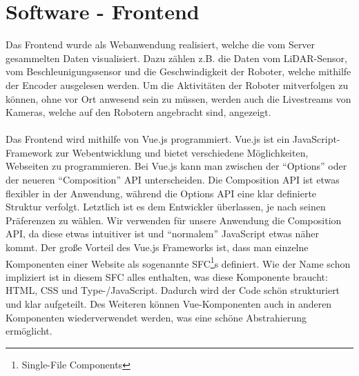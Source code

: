 
\chapter{Software - Frontend}
\label{sec:software_frontend}
Das Frontend wurde als Webanwendung realisiert,
welche die vom Server gesammelten Daten visualisiert.
%
Dazu zählen z.B. die Daten vom LiDAR-Sensor,
vom Beschleunigungssensor
und die Geschwindigkeit der Roboter,
welche mithilfe der Encoder ausgelesen werden.
%
Um die Aktivitäten der Roboter mitverfolgen zu können,
ohne vor Ort anwesend sein zu müssen,
werden auch die Livestreams von Kameras,
welche auf den Robotern angebracht sind,
angezeigt.
\\\\
Das Frontend wird mithilfe von Vue.js programmiert.
%
Vue.js ist ein JavaScript-Framework zur Webentwicklung
und bietet verschiedene Möglichkeiten,
Webseiten zu programmieren.
%
Bei Vue.js kann man zwischen der ``Options'' oder
der neueren ``Composition'' API unterscheiden.
%
Die Composition API ist etwas flexibler in der Anwendung,
während die Options API eine klar definierte Struktur verfolgt.
%
Letztlich ist es dem Entwickler überlassen,
je nach seinen Präferenzen zu wählen.
%
Wir verwenden für unsere Anwendung die Composition API,
da diese etwas intuitiver ist
und ``normalem'' JavaScript etwas näher kommt. 
%
Der große Vorteil des Vue.js Frameworks ist,
dass man einzelne Komponenten einer Website
als sogenannte SFC\footnote{Single-File Components}s definiert.
%
Wie der Name schon impliziert ist in diesem SFC alles enthalten,
was diese Komponente braucht: HTML, CSS und Type-/JavaScript.
%
Dadurch wird der Code schön strukturiert und klar aufgeteilt.
%
Des Weiteren können Vue-Komponenten auch
in anderen Komponenten wiederverwendet werden,
was eine schöne Abstrahierung ermöglicht.

